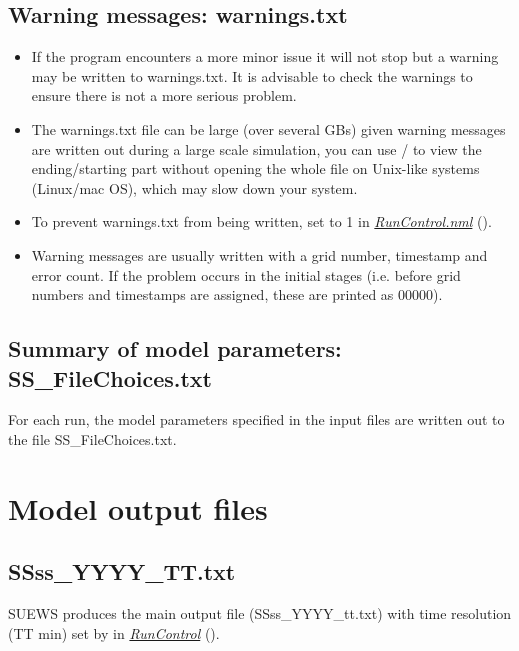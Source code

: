 \documentclass[letterpaper,10pt,english]{sphinxmanual}
\begin{document}
\subsection{Warning messages: warnings.txt}
\label{\detokenize{output-files:warning-messages-warnings-txt}}\begin{itemize}
\item {} 
If the program encounters a more minor issue it will not stop but a
warning may be written to warnings.txt. It is advisable to check the
warnings to ensure there is not a more serious problem.

\item {} 
The warnings.txt file can be large (over several GBs) given warning
messages are written out during a large scale simulation, you can use
/ to view the ending/starting part without opening
the whole file on Unix-like systems (Linux/mac OS), which may slow
down your system.

\item {} 
To prevent warnings.txt from being written, set 
to 1 in {\hyperref[\detokenize{output-files:RunControl.nml}]{\emph{RunControl.nml}}} ().

\item {} 
Warning messages are usually written with a grid number, timestamp
and error count. If the problem occurs in the initial stages (i.e.
before grid numbers and timestamps are assigned, these are printed as
00000).

\end{itemize}


\subsection{Summary of model parameters: SS\_FileChoices.txt}
\label{\detokenize{output-files:summary-of-model-parameters-ss-filechoices-txt}}
For each run, the model parameters specified in the input files are
written out to the file SS\_FileChoices.txt.


\section{Model output files}
\label{\detokenize{output-files:model-output-files}}

\subsection{SSss\_YYYY\_TT.txt}
\label{\detokenize{output-files:ssss-yyyy-tt-txt}}
SUEWS produces the main output file (SSss\_YYYY\_tt.txt) with time
resolution (TT min) set by  in
{\hyperref[\detokenize{output-files:RunControl}]{\emph{RunControl}}} ().
\end{document}
